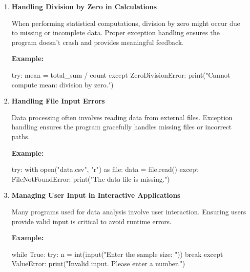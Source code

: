 \documentclass[
  letterpaper,
  DIV=11,
  numbers=noendperiod]{scrreprt}
\newenvironment{Shaded}{\begin{snugshade}}{\end{snugshade}}
\newcommand{\BuiltInTok}[1]{\textcolor[rgb]{0.00,0.23,0.31}{#1}}
\newcommand{\ControlFlowTok}[1]{\textcolor[rgb]{0.00,0.23,0.31}{#1}}
\newcommand{\ImportTok}[1]{\textcolor[rgb]{0.00,0.46,0.62}{#1}}
\newcommand{\NormalTok}[1]{\textcolor[rgb]{0.00,0.23,0.31}{#1}}
\newcommand{\OperatorTok}[1]{\textcolor[rgb]{0.37,0.37,0.37}{#1}}
\newcommand{\PreprocessorTok}[1]{\textcolor[rgb]{0.68,0.00,0.00}{#1}}
\newcommand{\StringTok}[1]{\textcolor[rgb]{0.13,0.47,0.30}{#1}}
\newcommand{\VariableTok}[1]{\textcolor[rgb]{0.07,0.07,0.07}{#1}}
\begin{document}
\begin{enumerate}
\def\labelenumi{\arabic{enumi}.}
\item
  \textbf{Handling Division by Zero in Calculations}

  When performing statistical computations, division by zero might occur
  due to missing or incomplete data. Proper exception handling ensures
  the program doesn't crash and provides meaningful feedback.

  \textbf{Example:}

\begin{Shaded}
\begin{Highlighting}[]
\ControlFlowTok{try}\NormalTok{:}
\NormalTok{    mean }\OperatorTok{=}\NormalTok{ total\_sum }\OperatorTok{/}\NormalTok{ count}
\ControlFlowTok{except} \PreprocessorTok{ZeroDivisionError}\NormalTok{:}
    \BuiltInTok{print}\NormalTok{(}\StringTok{"Cannot compute mean: division by zero."}\NormalTok{)}
\end{Highlighting}
\end{Shaded}
\item
  \textbf{Handling File Input Errors}

  Data processing often involves reading data from external files.
  Exception handling ensures the program gracefully handles missing
  files or incorrect paths.

  \textbf{Example:}

\begin{Shaded}
\begin{Highlighting}[]
\ControlFlowTok{try}\NormalTok{:}
    \ControlFlowTok{with} \BuiltInTok{open}\NormalTok{(}\StringTok{"data.csv"}\NormalTok{, }\StringTok{"r"}\NormalTok{) }\ImportTok{as} \BuiltInTok{file}\NormalTok{:}
\NormalTok{        data }\OperatorTok{=} \BuiltInTok{file}\NormalTok{.read()}
\ControlFlowTok{except} \PreprocessorTok{FileNotFoundError}\NormalTok{:}
    \BuiltInTok{print}\NormalTok{(}\StringTok{"The data file is missing."}\NormalTok{)}
\end{Highlighting}
\end{Shaded}
\item
  \textbf{Managing User Input in Interactive Applications}

  Many programs used for data analysis involve user interaction.
  Ensuring users provide valid input is critical to avoid runtime
  errors.

  \textbf{Example:}

\begin{Shaded}
\begin{Highlighting}[]
\ControlFlowTok{while} \VariableTok{True}\NormalTok{:}
    \ControlFlowTok{try}\NormalTok{:}
\NormalTok{        n }\OperatorTok{=} \BuiltInTok{int}\NormalTok{(}\BuiltInTok{input}\NormalTok{(}\StringTok{"Enter the sample size: "}\NormalTok{))}
        \ControlFlowTok{break}
    \ControlFlowTok{except} \PreprocessorTok{ValueError}\NormalTok{:}
        \BuiltInTok{print}\NormalTok{(}\StringTok{"Invalid input. Please enter a number."}\NormalTok{)}
\end{Highlighting}
\end{Shaded}
\end{enumerate}
\end{document}
